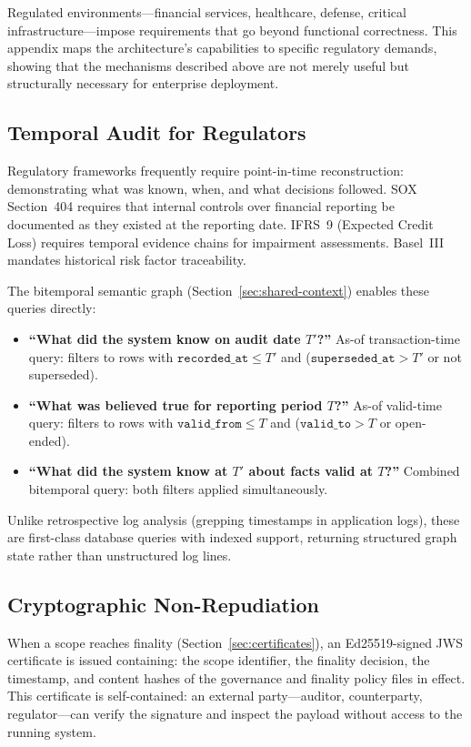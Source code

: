 \documentclass[11pt]{article}
\begin{document}
Regulated environments---financial services, healthcare, defense, critical infrastructure---impose requirements that go beyond functional correctness. This appendix maps the architecture's capabilities to specific regulatory demands, showing that the mechanisms described above are not merely useful but structurally necessary for enterprise deployment.

\subsection{Temporal Audit for Regulators}

Regulatory frameworks frequently require point-in-time reconstruction: demonstrating what was known, when, and what decisions followed. SOX Section~404 requires that internal controls over financial reporting be documented as they existed at the reporting date. IFRS~9 (Expected Credit Loss) requires temporal evidence chains for impairment assessments. Basel~III mandates historical risk factor traceability.

The bitemporal semantic graph (Section~\ref{sec:shared-context}) enables these queries directly:

\begin{itemize}
  \item \textbf{``What did the system know on audit date $T'$?''} As-of transaction-time query: filters to rows with $\texttt{recorded\_at} \leq T'$ and ($\texttt{superseded\_at} > T'$ or not superseded).
  \item \textbf{``What was believed true for reporting period $T$?''} As-of valid-time query: filters to rows with $\texttt{valid\_from} \leq T$ and ($\texttt{valid\_to} > T$ or open-ended).
  \item \textbf{``What did the system know at $T'$ about facts valid at $T$?''} Combined bitemporal query: both filters applied simultaneously.
\end{itemize}

Unlike retrospective log analysis (grepping timestamps in application logs), these are first-class database queries with indexed support, returning structured graph state rather than unstructured log lines.

\subsection{Cryptographic Non-Repudiation}

When a scope reaches finality (Section~\ref{sec:certificates}), an Ed25519-signed JWS certificate is issued containing: the scope identifier, the finality decision, the timestamp, and content hashes of the governance and finality policy files in effect. This certificate is self-contained: an external party---auditor, counterparty, regulator---can verify the signature and inspect the payload without access to the running system.
\end{document}
